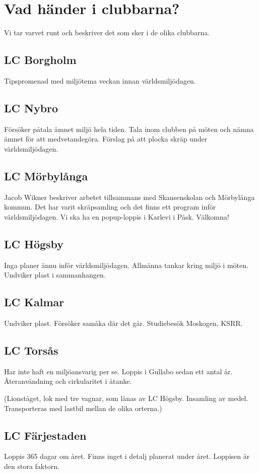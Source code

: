 \documentclass[12pt,a4paper]{article}
\begin{document}
\section{Vad händer i clubbarna?}
Vi tar varvet runt och beskriver det som sker i de olika clubbarna.

\subsection{LC Borgholm}
Tipspromenad med miljötema veckan innan världsmiljödagen.

\subsection{LC Nybro}
Försöker påtala ämnet miljö hela tiden. Tala inom clubben på möten och nämna ämnet för att medvetandegöra.
Förslag på att plocka skräp under världsmiljödagen.

\subsection{LC Mörbylånga}
Jacob Wikner beskriver arbetet tillsammans med Skansenskolan och Mörbylånga kommun. Det har varit skräpsamling och det finns ett program inför världsmiljödagen. Vi ska ha en popup-loppis i Karlevi i Påsk. Välkomna!

\subsection{LC Högsby}
Inga planer ännu inför världsmiljödagen. Allmänna tankar kring miljö i möten. Undviker plast i sammanhangen.

\subsection{LC Kalmar}
Undviker plast. Försöker samåka där det går.
Studiebesök Moskogen, KSRR.

\subsection{LC Torsås}
Har inte haft en miljöansvarig per se.
Loppis i Gullabo sedan ett antal år. Återanvändning och cirkularitet i åtanke.

(Lionståget, lok med tre vagnar, som lånas av LC Högsby. Insamling av medel. Transporteras med lastbil mellan de olika orterna.)

\subsection{LC Färjestaden}
Loppis 365 dagar om året.
Finns inget i detalj planerat under året. Loppisen är den stora faktorn.
\end{document}
